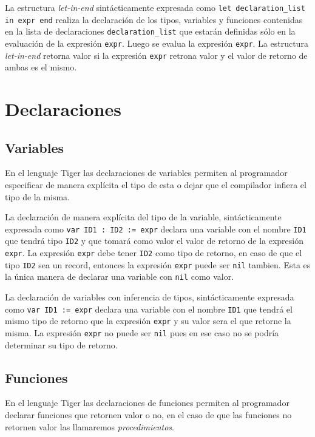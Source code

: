 \documentclass{article}
\begin{document}
La estructura \emph{let-in-end} sintácticamente expresada como
\verb|let declaration_list in expr end| realiza la declaración de los tipos,
variables y funciones contenidas en la lista de declaraciones
\verb|declaration_list| que estarán definidas sólo en la evaluación de la
expresión \verb|expr|. Luego se evalua la expresión \verb|expr|. La estructura
\emph{let-in-end} retorna valor si la expresión \verb|expr| retrona valor y el
valor de retorno de ambas es el mismo.

\section{Declaraciones}

\subsection{Variables}

En el lenguaje Tiger las declaraciones de variables permiten al programador
especificar de manera explícita el tipo de esta o dejar que el compilador
infiera el tipo de la misma.

La declaración de manera explícita del tipo de la variable, sintácticamente
expresada como \verb|var ID1 : ID2 := expr| declara una variable con el nombre
\verb|ID1| que tendrá tipo \verb|ID2| y que tomará como valor el valor de
retorno de la expresión \verb|expr|. La expresión \verb|expr| debe tener
\verb|ID2| como tipo de retorno, en caso de que el tipo \verb|ID2| sea un
record, entonces la expresión \verb|expr| puede ser \verb|nil| tambien. Esta es
la única manera de declarar una variable con \verb|nil| como valor.

La declaración de variables con inferencia de tipos, sintácticamente expresada
como \verb|var ID1 := expr|  declara una variable con el nombre \verb|ID1| que
tendrá el mismo tipo de retorno que la expresión \verb|expr| y su valor sera el
que retorne la misma. La expresión \verb|expr| no puede ser \verb|nil| pues en
ese caso no se podría determinar su tipo de retorno.

\subsection{Funciones}

En el lenguaje Tiger las declaraciones de funciones permiten al programador
declarar funciones que retornen valor o no, en el caso de que las funciones no
retornen valor las llamaremos \emph{procedimientos}.
\end{document}
